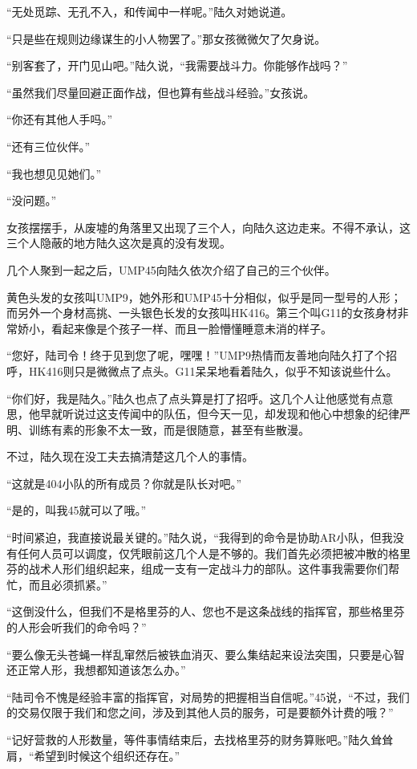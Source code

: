 “无处觅踪、无孔不入，和传闻中一样呢。”陆久对她说道。

“只是些在规则边缘谋生的小人物罢了。”那女孩微微欠了欠身说。

“别客套了，开门见山吧。”陆久说，“我需要战斗力。你能够作战吗？”

“虽然我们尽量回避正面作战，但也算有些战斗经验。”女孩说。

“你还有其他人手吗。”

“还有三位伙伴。”

“我也想见见她们。”

“没问题。”

女孩摆摆手，从废墟的角落里又出现了三个人，向陆久这边走来。不得不承认，这三个人隐蔽的地方陆久这次是真的没有发现。

几个人聚到一起之后，UMP45向陆久依次介绍了自己的三个伙伴。

黄色头发的女孩叫UMP9，她外形和UMP45十分相似，似乎是同一型号的人形；而另外一个身材高挑、一头银色长发的女孩叫HK416。第三个叫G11的女孩身材非常娇小，看起来像是个孩子一样、而且一脸懵懂睡意未消的样子。

“您好，陆司令！终于见到您了呢，嘿嘿！”UMP9热情而友善地向陆久打了个招呼，HK416则只是微微点了点头。G11呆呆地看着陆久，似乎不知该说些什么。

“你们好，我是陆久。”陆久也点了点头算是打了招呼。这几个人让他感觉有点意思，他早就听说过这支传闻中的队伍，但今天一见，却发现和他心中想象的纪律严明、训练有素的形象不太一致，而是很随意，甚至有些散漫。

不过，陆久现在没工夫去搞清楚这几个人的事情。

“这就是404小队的所有成员？你就是队长对吧。”

“是的，叫我45就可以了哦。”

“时间紧迫，我直接说最关键的。”陆久说，“我得到的命令是协助AR小队，但我没有任何人员可以调度，仅凭眼前这几个人是不够的。我们首先必须把被冲散的格里芬的战术人形们组织起来，组成一支有一定战斗力的部队。这件事我需要你们帮忙，而且必须抓紧。”

“这倒没什么，但我们不是格里芬的人、您也不是这条战线的指挥官，那些格里芬的人形会听我们的命令吗？”

“要么像无头苍蝇一样乱窜然后被铁血消灭、要么集结起来设法突围，只要是心智还正常人形，我想都知道该怎么办。”

“陆司令不愧是经验丰富的指挥官，对局势的把握相当自信呢。”45说，“不过，我们的交易仅限于我们和您之间，涉及到其他人员的服务，可是要额外计费的哦？”

“记好营救的人形数量，等件事情结束后，去找格里芬的财务算账吧。”陆久耸耸肩，“希望到时候这个组织还存在。”

